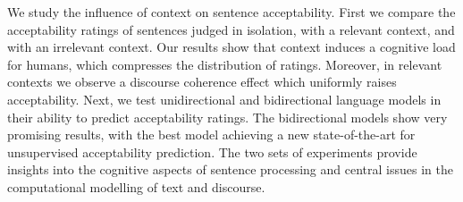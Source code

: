 We study the influence of context on sentence acceptability. First we compare the acceptability ratings of sentences judged in isolation, with a relevant context, and with an irrelevant context. Our results show that context induces a cognitive load for humans, which compresses the distribution of ratings. Moreover, in relevant contexts we observe a discourse coherence effect which uniformly raises acceptability. Next, we test unidirectional and bidirectional language models in their ability to predict acceptability ratings. The bidirectional models show very promising results, with the best model achieving a new state-of-the-art for unsupervised acceptability prediction. The two sets of experiments provide insights into the cognitive aspects of sentence processing and central issues in the computational modelling of text and discourse.